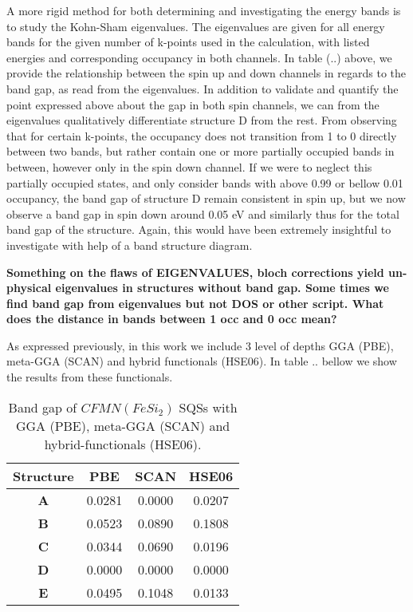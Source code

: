 A more rigid method for both determining and investigating the energy bands is to study the Kohn-Sham eigenvalues. The eigenvalues are given for all energy bands for the given number of k-points used in the calculation, with listed energies and corresponding occupancy in both channels.  In table (..) above, we provide the relationship between the spin up and down channels in regards to the band gap, as read from the eigenvalues. In addition to validate and quantify the point expressed above about the gap in both spin channels, we can from the eigenvalues qualitatively differentiate structure D from the rest. From observing that for certain k-points, the occupancy does not transition from 1 to 0 directly between two bands, but rather contain one or more partially occupied bands in between, however only in the spin down channel. If we were to neglect this partially occupied states, and only consider bands with above 0.99 or bellow 0.01 occupancy, the band gap of structure D remain consistent in spin up, but we now observe a band gap in spin down around 0.05 eV and similarly thus for the total band gap of the structure. Again, this would have been extremely insightful to investigate with help of a band structure diagram.

\textbf{Something on the flaws of EIGENVALUES, bloch corrections yield un-physical eigenvalues in structures without band gap. Some times we find band gap from eigenvalues but not DOS or other script. What does the distance in bands between 1 occ and 0 occ mean?} 


As expressed previously, in this work we include 3 level of depths GGA (PBE), meta-GGA (SCAN) and hybrid functionals (HSE06). In table .. bellow we show the results from these functionals. 

\begin{table}[H]
\centering
\begin{tabular}{@{}cccc@{}}
\toprule
Structure  & PBE    & SCAN   & HSE06  \\ \midrule
\textbf{A} & 0.0281 & 0.0000 & 0.0207 \\
\textbf{B} & 0.0523 & 0.0890 & 0.1808 \\
\textbf{C} & 0.0344 & 0.0690 & 0.0196 \\
\textbf{D} & 0.0000 & 0.0000 & 0.0000 \\
\textbf{E} & 0.0495 & 0.1048 & 0.0133 \\ \bottomrule
\end{tabular}
\caption{Band gap of $CFMN (FeSi_2)$ SQSs with GGA (PBE), meta-GGA (SCAN) and hybrid-functionals (HSE06).}
\end{table}


